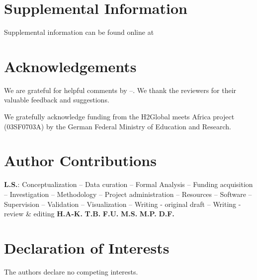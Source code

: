 \documentclass[5p]{elsarticle}
\begin{document}





\section*{Supplemental Information}

Supplemental information can be found online at %

\section*{Acknowledgements}

We are grateful for helpful comments by --. We thank the
reviewers for their valuable feedback and suggestions.

We gratefully acknowledge funding from the H2Global meets Africa project (03SF0703A) by the German Federal Ministry of Education and Research.

\section*{Author Contributions}


\textbf{L.S.}:
Conceptualization --
Data curation --
Formal Analysis --
Funding acquisition --
Investigation --
Methodology --
Project administration --
Resources --
Software --
Supervision --
Validation --
Visualization --
Writing - original draft --
Writing - review \& editing
\textbf{H.A-K.}
\textbf{T.B.}
\textbf{F.U.}
\textbf{M.S.}
\textbf{M.P.}
\textbf{D.F.}




\section*{Declaration of Interests}

The authors declare no competing interests.

\renewcommand{\ttdefault}{\sfdefault}

\end{document}

